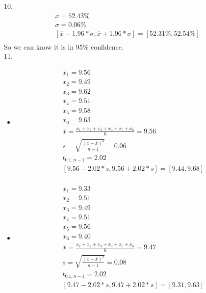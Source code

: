 \documentclass{article}
\begin{document}
10.\begin{equation}
    \begin{multlined}
        \overline{x} = 52.43\%\\
        \sigma = 0.06\%\\
        \left[\overline{x} - 1.96*\sigma, \overline{x} + 1.96*\sigma\right] = \left[52.31\%, 52.54\%\right]\\
    \end{multlined}
\end{equation}
So we can know it is in 95\% confidence.\\
11.\begin{itemize}
    \item 
    \begin{equation}
        \begin{multlined}
            x_1 = 9.56\\
            x_2 = 9.49\\
            x_3 = 9.62\\
            x_4 = 9.51\\
            x_5 = 9.58\\
            x_6 = 9.63\\
            \overline{x} = \frac{x_1+x_2+x_3+x_4+x_5+x_6}{6} = 9.56\\
            s = \sqrt{\frac{\left(x - \overline{x}\right)^2}{n- 1}} = 0.06\\
            t_{0.1, n - 1} = 2.02\\
            \left[9.56 - 2.02 * s, 9.56 + 2.02 *s\right] = \left[9.44, 9.68\right]\\
        \end{multlined}
    \end{equation}
    \item
    \begin{equation}
        \begin{multlined}
            x_1 = 9.33\\
            x_2 = 9.51\\
            x_3 = 9.49\\
            x_4 = 9.51\\
            x_5 = 9.56\\
            x_6 = 9.40\\
            \overline{x} = \frac{x_1+x_2+x_3+x_4+x_5+x_6}{6} = 9.47\\
            s = \sqrt{\frac{\left(x - \overline{x}\right)^2}{n- 1}} = 0.08\\
            t_{0.1, n - 1} = 2.02\\
            \left[9.47 - 2.02 * s, 9.47 + 2.02 *s\right] = \left[9.31, 9.63\right]\\
        \end{multlined}
    \end{equation}
\end{itemize}
\end{document}
